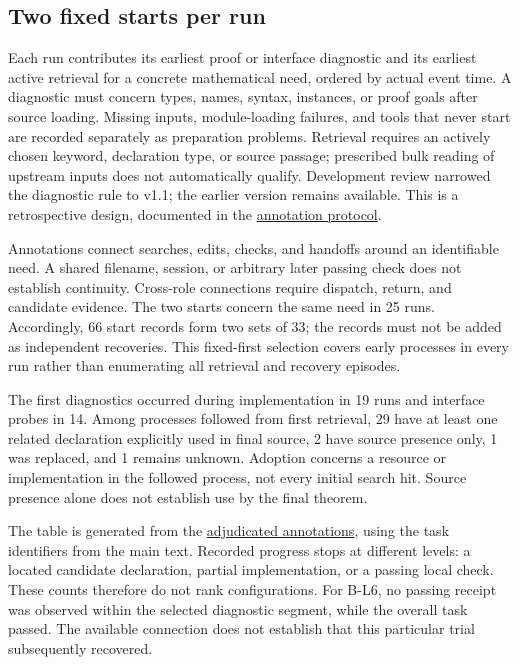 \subsection[Two fixed starts per run]{\texorpdfstring{\protect\hypertarget{s2}{}Two fixed starts per run}{Two fixed starts per run}}
Each run contributes its earliest proof or interface diagnostic and its earliest active retrieval for a concrete mathematical need, ordered by actual event time. A diagnostic must concern types, names, syntax, instances, or proof goals after source loading. Missing inputs, module-loading failures, and tools that never start are recorded separately as preparation problems. Retrieval requires an actively chosen keyword, declaration type, or source passage; prescribed bulk reading of upstream inputs does not automatically qualify. Development review narrowed the diagnostic rule to v1.1; the earlier version remains available. This is a retrospective design, documented in the \href{research/semantic/PROTOCOL.zh-CN.md}{annotation protocol}.

Annotations connect searches, edits, checks, and handoffs around an identifiable need. A shared filename, session, or arbitrary later passing check does not establish continuity. Cross-role connections require dispatch, return, and candidate evidence. The two starts concern the same need in 25 runs. Accordingly, 66 start records form two sets of 33; the records must not be added as independent recoveries. This fixed-first selection covers early processes in every run rather than enumerating all retrieval and recovery episodes.

The first diagnostics occurred during implementation in 19 runs and interface probes in 14. Among processes followed from first retrieval, 29 have at least one related declaration explicitly used in final source, 2 have source presence only, 1 was replaced, and 1 remains unknown. Adoption concerns a resource or implementation in the followed process, not every initial search hit. Source presence alone does not establish use by the final theorem.

The table is generated from the \href{research/semantic/adjudicated_annotations.json}{adjudicated annotations}, using the task identifiers from the main text. Recorded progress stops at different levels: a located candidate declaration, partial implementation, or a passing local check. These counts therefore do not rank configurations. For B-L6, no passing receipt was observed within the selected diagnostic segment, while the overall task passed. The available connection does not establish that this particular trial subsequently recovered.

